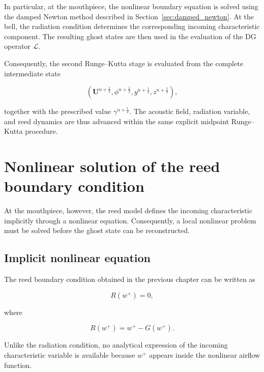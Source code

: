 \documentclass[11pt,a4paper]{report}
\theoremstyle{plain}
\theoremstyle{definition}
\begin{document}
In particular, at the mouthpiece, the nonlinear boundary equation is solved
using the damped Newton method described in
Section~\ref{sec:damped_newton}. At the bell, the radiation condition
determines the corresponding incoming characteristic component. The resulting
ghost states are then used in the evaluation of the DG operator
\(\mathcal L\).

Consequently, the second Runge--Kutta stage is evaluated from the complete
intermediate state

\begin{equation}
\left(
\mathbf U^{n+\frac12},
\phi^{n+\frac12},
y^{n+\frac12},
z^{n+\frac12}
\right),
\end{equation}

together with the prescribed value
\(\gamma^{n+\frac12}\). The acoustic field, radiation variable, and reed
dynamics are thus advanced within the same explicit midpoint Runge--Kutta
procedure.




\section{Nonlinear solution of the reed boundary condition}
\label{sec:reed_nonlinear_boundary}

At the mouthpiece, however, the reed model defines the incoming
characteristic implicitly through a nonlinear equation. Consequently, a local
nonlinear problem must be solved before the ghost state can be reconstructed.


\subsection{Implicit nonlinear equation}

The reed boundary condition obtained in the previous chapter can be written as

\begin{equation}
R(w^+)=0,
\end{equation}

where

\begin{equation}
R(w^+)
=
w^+
-
G(w^+).
\end{equation}

Unlike the radiation condition, no analytical expression of the incoming
characteristic variable is available because \(w^+\) appears inside the
nonlinear airflow function.
\end{document}
